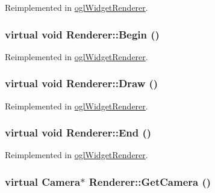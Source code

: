 Reimplemented in \hyperlink{classogl_widget_renderer_c9fcd00dffcc0a44a9bfff90811e586e}{oglWidgetRenderer}.\hypertarget{class_renderer_7f24c7de101eff6bd26906c0555f8610}{
\subsubsection[{Begin}]{\setlength{\rightskip}{0pt plus 5cm}virtual void Renderer::Begin ()}}
\label{class_renderer_7f24c7de101eff6bd26906c0555f8610}




Reimplemented in \hyperlink{classogl_widget_renderer_1892829478f840e8a0d7032f94af6d26}{oglWidgetRenderer}.\hypertarget{class_renderer_91f20cf8d7e9d12db1725cc15ca16d96}{
\subsubsection[{Draw}]{\setlength{\rightskip}{0pt plus 5cm}virtual void Renderer::Draw ()}}
\label{class_renderer_91f20cf8d7e9d12db1725cc15ca16d96}




Reimplemented in \hyperlink{classogl_widget_renderer_f4a8764df5f2b79e37d2a23cf268ed44}{oglWidgetRenderer}.\hypertarget{class_renderer_d08d100b0c4d2f57417a06ceaaa2ba4e}{
\subsubsection[{End}]{\setlength{\rightskip}{0pt plus 5cm}virtual void Renderer::End ()}}
\label{class_renderer_d08d100b0c4d2f57417a06ceaaa2ba4e}




Reimplemented in \hyperlink{classogl_widget_renderer_f4f9aab6b1dfc9888de5b9f0504be3e8}{oglWidgetRenderer}.\hypertarget{class_renderer_527858930942368379414c1be75b5738}{
\subsubsection[{GetCamera}]{\setlength{\rightskip}{0pt plus 5cm}virtual {\bf Camera}$\ast$ Renderer::GetCamera ()}}
\label{class_renderer_527858930942368379414c1be75b5738}




